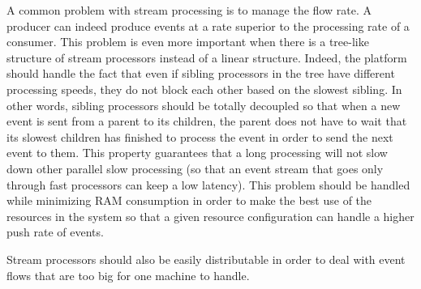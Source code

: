 A common problem with stream processing is to manage the flow rate. A producer can indeed produce events at a rate superior to
the processing rate of a consumer. This problem is even more important when there is a tree-like structure of stream processors instead of a linear structure. Indeed, the platform should handle the fact that even if sibling processors in the tree have different processing speeds, they do not block each other based on the slowest sibling. In other words, sibling processors should be totally decoupled so that when a new event is sent from a parent to its children, the parent does not have to wait that its slowest
children has finished to process the event in order to send the next event to them. This property guarantees that a long processing will not slow down other parallel slow processing (so that an event stream that goes only through fast processors can keep a low latency). This problem should be handled while minimizing RAM consumption in order to make the best use of the resources in the system so that a given resource configuration can handle a higher push rate of events.

Stream processors should also be easily distributable in order to deal with event flows that are too big for one machine to handle.


